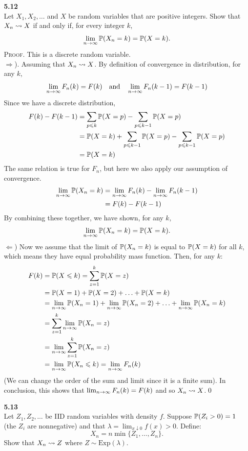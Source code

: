 \newpage\noindent
\textbf{5.12}\\  %
Let $X_1,X_2,\ldots$ and $X$ be random variables that are positive integers.
Show that $X_n\raD X$ if and only if, for every integer $k$,
$$
\lim_{n\ra\infty} \P(X_n = k) = \P(X = k).
$$
\textsc{Proof}. This is a discrete random variable.\\
$\Rightarrow$). Assuming that $X_n\raD X$. By definition of convergence in distribution,
for any $k$,
$$
\lim_{n\ra\infty} F_n(k) = F(k)
\quad\text{and}\quad
\lim_{n\ra\infty} F_n(k-1) = F(k-1)
$$
Since we have a discrete distribution,
\begin{align*}
    F(k) - F(k-1)
    &= \sum_{p\leq k}\P(X=p) - \sum_{p\leq k-1}\P(X=p) \\
    &= \P(X=k) + \sum_{p\leq k-1}\P(X=p) - \sum_{p\leq k-1}\P(X=p) \\
    &= \P(X=k)
\end{align*}
The same relation is true for $F_n$, but here we also apply our assumption of convergence.
\begin{align*}
    \lim_{n\ra\infty}\P(X_n=k) &= \lim_{n\ra\infty}F_n(k) - \lim_{n\ra\infty}F_n(k-1) \\
    &= F(k) - F(k-1)
\end{align*}
By combining these together, we have shown, for any $k$,
$$
\lim_{n\ra\infty}\P(X_n=k) = \P(X=k).
$$
$\Leftarrow$) Now we assume that the limit of $\P(X_n = k)$ is equal to $\P(X = k)$ for all $k$,
which means they have equal probability mass function. Then, for any $k$:
\begin{align*}
    F(k) &= \P(X\leq k) = \sum_{z=1}^k\P(X = z) \\
    &= \P(X = 1) + \P(X = 2) + \ldots + \P(X = k) \\
    &= \lim_{n\ra\infty}\P(X_n = 1) + \lim_{n\ra\infty}\P(X_n = 2) + \ldots + \lim_{n\ra\infty}\P(X_n = k) \\
    &= \sum_{z=1}^k\lim_{n\ra\infty}\P(X_n = z) \\
    &= \lim_{n\ra\infty}\sum_{z=1}^k\P(X_n = z) \\
    &= \lim_{n\ra\infty} \P(X_n\leq k) = \lim_{n\ra\infty} F_n(k)
\end{align*}
(We can change the order of the sum and limit since it is a finite sum).
In conclusion, this shows that $\lim_{n\ra\infty} F_n(k) = F(k)$ and so $X_n\raD X$.\qed

\bigskip\noindent
\textbf{5.13}\\  %
Let $Z_1,Z_2,\ldots$ be IID random variables with density $f$. Suppose
$\P(Z_i > 0) = 1$ (the $Z_i$ are nonnegative) and that $\lambda =\lim_{x\downarrow 0}f(x) > 0$.
Define:
$$
X_n = n\min\{Z_1,\ldots, Z_n\}.
$$
Show that $X_n\raD Z$ where $Z\sim\text{Exp}(\lambda)$.

